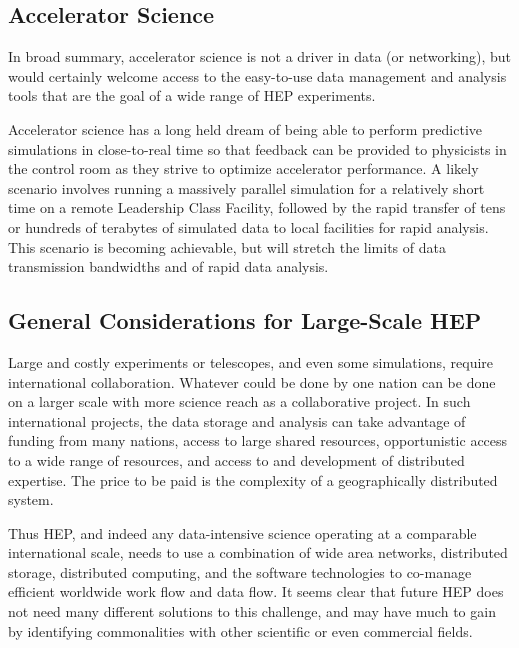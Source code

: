 \subsection{Accelerator Science}
In broad summary, accelerator science is not a driver in data (or networking), but would 
certainly welcome access to the easy-to-use data management and analysis tools that are 
the goal of a wide range of HEP experiments.

Accelerator science has a long held dream of being able to perform predictive simulations 
in close-to-real time so that feedback can be provided to physicists in the control room as 
they strive to optimize accelerator performance.  A likely scenario involves running a massively 
parallel simulation for a relatively short time on a remote Leadership Class Facility, followed 
by the rapid transfer of tens or hundreds of terabytes of simulated data to local facilities 
for rapid analysis.  This scenario is becoming achievable, but will stretch the limits of data 
transmission bandwidths and of rapid data analysis.

\subsection{General Considerations for Large-Scale HEP}
Large and costly experiments or telescopes, and even some simulations, require 
international collaboration.  Whatever could be done by one nation can be done 
on a larger scale with more science reach as a collaborative project.  In such 
international projects, the data storage and analysis can take advantage of funding 
from many nations, access to large shared resources, opportunistic access to a wide 
range of resources, and access to and development of distributed expertise.  
The price to be paid is the complexity of a geographically distributed system.

Thus HEP, and indeed any data-intensive science operating at a comparable 
international scale, needs to use a combination of wide area networks, 
distributed storage, distributed computing, and the software technologies 
to co-manage efficient worldwide work flow and data flow.  It seems clear 
that future HEP does not need many different solutions to this challenge, 
and may have much to gain by identifying commonalities with other 
scientific or even commercial fields.

